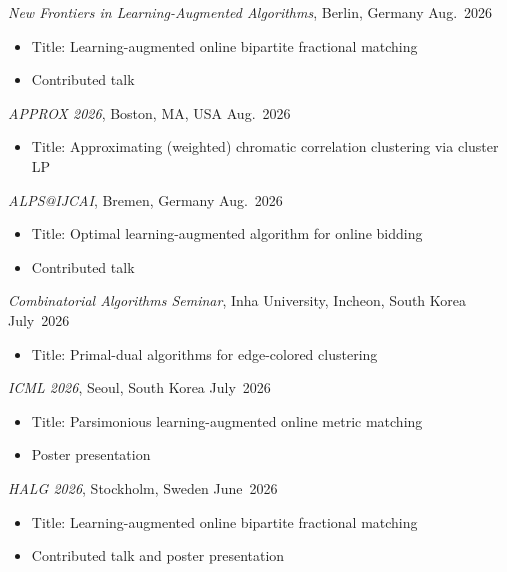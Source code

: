 \documentclass{article}
\newcommand{\killinitspace}{-0.7em}
\begin{document}
\textsl{New Frontiers in Learning-Augmented Algorithms}, Berlin, Germany \hfill Aug.~2026
\vspace{\killinitspace}
\begin{itemize}
\item Title: Learning-augmented online bipartite fractional matching
\item Contributed talk
\end{itemize}

\textsl{APPROX 2026}, Boston, MA, USA \hfill Aug.~2026
\vspace{\killinitspace}
\begin{itemize}
\item Title: Approximating (weighted) chromatic correlation clustering via cluster LP
\end{itemize}

\textsl{ALPS@IJCAI}, Bremen, Germany \hfill Aug.~2026
\vspace{\killinitspace}
\begin{itemize}
\item Title: Optimal learning-augmented algorithm for online bidding
\item Contributed talk
\end{itemize}

\textsl{Combinatorial Algorithms Seminar}, Inha University, Incheon, South Korea \hfill July~2026
\vspace{\killinitspace}
\begin{itemize}
\item Title: Primal-dual algorithms for edge-colored clustering
\end{itemize}

\textsl{ICML 2026}, Seoul, South Korea \hfill July~2026
\vspace{\killinitspace}
\begin{itemize}
\item Title: Parsimonious learning-augmented online metric matching
\item Poster presentation
\end{itemize}

\textsl{HALG 2026}, Stockholm, Sweden \hfill June~2026
\vspace{\killinitspace}
\begin{itemize}
\item Title: Learning-augmented online bipartite fractional matching
\item Contributed talk and poster presentation
\end{itemize}
\end{document}
